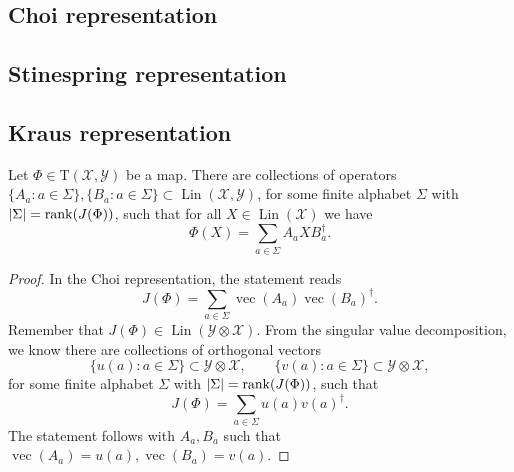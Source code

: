 \documentclass[12pt]{report}
\newcommand{\on}[1]{\operatorname{#1}}
\newcommand{\calY}{{\mathcal{Y}}}
\newcommand{\calX}{{\mathcal{X}}}
\newcommand{\rmT}{{\mathrm{T}}}
\DeclareMathOperator{\Lin}{Lin}
\begin{document}
\subsection{Choi representation}

\subsection{Stinespring representation}

\subsection{Kraus representation}

\begin{prop}
	Let $\Phi\in\rmT(\calX,\calY)$ be a map. There are collections of operators $\{A_a: a\in\Sigma\},\{B_a: a\in\Sigma\}\subset\Lin(\calX,\calY)$, for some finite alphabet $\Sigma$ with $\lvert\Sigma\rvert=\rank(J(\Phi))$, such that for all $X\in\Lin(\calX)$ we have
	\begin{equation}
		\Phi(X) = \sum_{a\in\Sigma} A_a X B_a^\dagger.
	\end{equation}
\end{prop}
\begin{proof}
	In the Choi representation, the statement reads
	\begin{equation}
		J(\Phi) = \sum_{a\in\Sigma} \on{vec}(A_a) \on{vec}(B_a)^\dagger.
	\end{equation}
	Remember that $J(\Phi)\in\Lin(\calY\otimes\calX)$.
	From the singular value decomposition, we know there are collections of orthogonal vectors
	\begin{equation}
		\{u(a):a\in\Sigma\}\subset \calY\otimes\calX, \qquad
		\{v(a):a\in\Sigma\}\subset \calY\otimes\calX,
	\end{equation}
	for some finite alphabet $\Sigma$ with $\lvert\Sigma\rvert=\rank(J(\Phi))$, such that
	\begin{equation}
		J(\Phi) = \sum_{a\in\Sigma} u(a) v(a)^\dagger.
	\end{equation}
	The statement follows with $A_a,B_a$ such that $\on{vec}(A_a)=u(a), \on{vec}(B_a)=v(a)$.
\end{proof}
\end{document}
